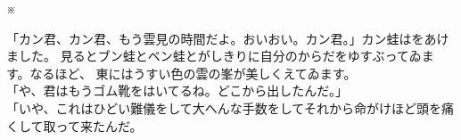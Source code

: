 \documentclass[
a4paper,
10pt,
book]
{tarticle}
\begin{document}
\indent \indent \indent \indent \indent \indent \indent \indent \indent \indent ※

\begin{linenumbers}
    「カン君、カン君、もう雲見の時間だよ。おいおい。カン君。」カン蛙はをあけました。
    見るとブン蛙とベン蛙とがしきりに自分のからだをゆすぶってゐます。なるほど、
    東にはうすい色の雲の峯が美しくえてゐます。\\
    「や、君はもうゴム靴をはいてるね。どこから出したんだ。」\\
    「いや、これはひどい難儀をして大へんな手数をしてそれから命がけほど頭を痛くして取って来たんだ。
\end{linenumbers}

\newpage
\setcounter{page}{10}
\thispagestyle{fancy}
\end{document}
